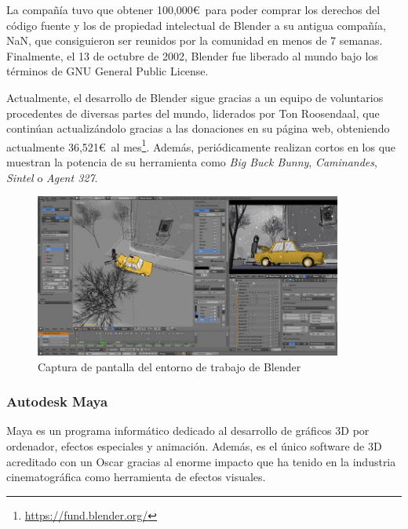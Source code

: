 La compañía tuvo que obtener 100,000\euro \ para poder comprar los derechos del código fuente y los de propiedad intelectual de Blender a su antigua compañía, NaN, que consiguieron ser reunidos por la comunidad en menos de 7 semanas. Finalmente, el 13 de octubre de 2002, Blender fue liberado al mundo bajo los términos de GNU General Public License. 

Actualmente, el desarrollo de Blender sigue gracias a un equipo de voluntarios procedentes de diversas partes del mundo, liderados por Ton Roosendaal, que continúan actualizándolo gracias a las donaciones en su página web, obteniendo actualmente 36,521\euro \ al mes\footnote{\url{https://fund.blender.org/}}. Además, periódicamente realizan cortos en los que muestran la potencia de su herramienta como \textit{Big Buck Bunny}, \textit{Caminandes}, \textit{Sintel} o \textit{Agent 327}.

\begin{figure}[!h]
\vspace{0.5cm}
\begin{center}
\includegraphics[width=0.9\textwidth]{imagenes/2/blender.jpg}
\caption{Captura de pantalla del entorno de trabajo de Blender}
\label{fig:blender}
\end{center}
\vspace{-0.5cm}
\end{figure}

\subsubsection{Autodesk Maya}

Maya es un programa informático dedicado al desarrollo de gráficos 3D por ordenador, efectos especiales y animación. Además, es el único software de 3D acreditado con un Oscar gracias al enorme impacto que ha tenido en la industria cinematográfica como herramienta de efectos visuales.


